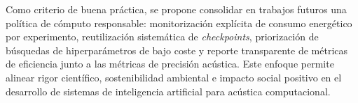 Como criterio de buena práctica, se propone consolidar en trabajos futuros una política de cómputo responsable: monitorización explícita de consumo energético por experimento, reutilización sistemática de \textit{checkpoints}, priorización de búsquedas de hiperparámetros de bajo coste y reporte transparente de métricas de eficiencia junto a las métricas de precisión acústica. Este enfoque permite alinear rigor científico, sostenibilidad ambiental e impacto social positivo en el desarrollo de sistemas de inteligencia artificial para acústica computacional.
